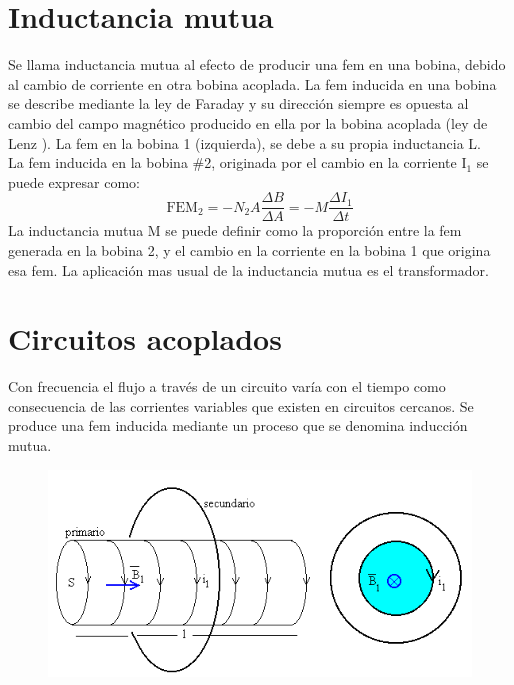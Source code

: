 \documentclass[a4paper,11pt]{report}
\begin{document}
\chapter{Inductancia mutua}
Se llama inductancia mutua al efecto de producir una fem en una bobina, debido al cambio de corriente en otra bobina acoplada. La fem inducida en una bobina se describe mediante la ley de Faraday y su dirección siempre es opuesta al cambio del campo magnético producido en ella por la bobina acoplada (ley de Lenz ). La fem en la bobina 1 (izquierda), se debe a su propia inductancia L.\\
La fem inducida en la bobina \#2, originada por el cambio en la corriente I$_{1}$ se puede expresar como:
$$
\mathrm{FEM}_{2} = -N_{2}A\frac{\Delta B}{\Delta A} = -M\frac{\Delta I_{1}}{\Delta t}
$$
La inductancia mutua M se puede definir como la proporción entre la fem generada en la bobina 2, y el cambio en la corriente en la bobina 1 que origina esa fem. La aplicación mas usual de la inductancia mutua es el transformador.
\chapter{Circuitos acoplados}
Con frecuencia el flujo a través de un circuito varía con el tiempo como consecuencia de las corrientes variables que existen en circuitos cercanos. Se produce una fem inducida mediante un proceso que se denomina inducción mutua.
\begin{figure}[H]
\centering
\includegraphics[scale=0.8]{Acoplados1.png}
\end{figure}
\end{document}
